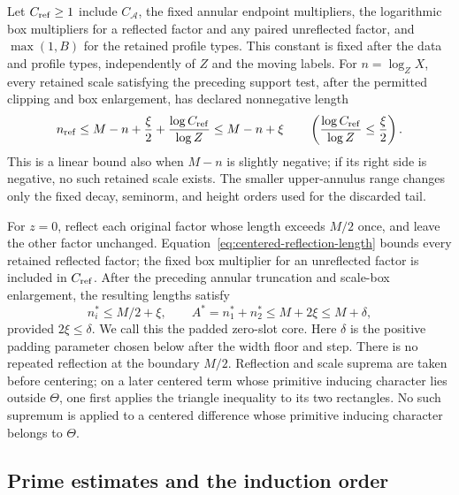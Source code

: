 \documentclass[12pt]{article}
\begin{document}
Let \(C_{\rm ref}\ge1\) include \(C_{\mathcal A}\), the fixed annular
endpoint multipliers, the logarithmic box multipliers for a reflected
factor and any paired unreflected factor, and \(\max(1,B)\) for the
retained profile types.  This constant is fixed after the data and
profile types, independently of \(Z\) and the moving labels.  For
\(n=\log_ZX\), every retained scale satisfying the preceding support
test, after the permitted clipping and box enlargement, has declared
nonnegative length
\begin{equation}
 n_{\rm ref}\le M-n+\frac\xi2+\frac{\log C_{\rm ref}}{\log Z}
 \le M-n+\xi
 \qquad\left(\frac{\log C_{\rm ref}}{\log Z}\le\frac\xi2\right).
 \label{eq:centered-reflection-length}
\end{equation}
This is a linear bound also when \(M-n\) is slightly negative; if its
right side is negative, no such retained scale exists.  The smaller
upper-annulus range changes only the fixed decay, seminorm, and height
orders used for the discarded tail.

For \(z=0\), reflect each original factor whose length exceeds \(M/2\)
once, and leave the other factor unchanged.  Equation~\eqref{eq:centered-reflection-length}
bounds every retained reflected factor; the fixed box multiplier for
an unreflected factor is included in \(C_{\rm ref}\).  After the preceding
annular truncation and scale-box enlargement, the resulting lengths
satisfy
\begin{equation}
 n_i^*\le M/2+\xi,\qquad
 A^*=n_1^*+n_2^*\le M+2\xi\le M+\delta,
 \label{old-eq:2.1h}
\end{equation}
provided \(2\xi\le\delta\).  We call this the padded zero-slot core.
Here \(\delta\) is the positive padding parameter chosen below after the
width floor and step.
There is no repeated reflection at the boundary \(M/2\).  Reflection
and scale suprema are taken before centering; on a later centered term
whose primitive inducing character lies outside \(\Theta\), one first
applies the triangle inequality to its two rectangles.  No such supremum
is applied to a centered difference whose primitive inducing character
belongs to \(\Theta\).

\subsection{Prime estimates and the induction order}\label{sec:weighted}
\end{document}
